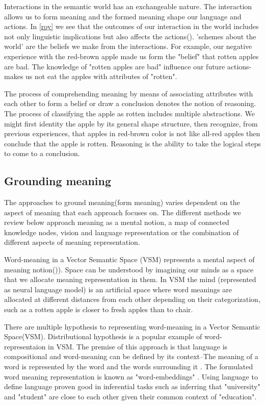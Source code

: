\documentclass[11pt, a4paper]{article}
\begin{document}
Interactions in the semantic world  has an exchangeable nature. The interaction allows us to form meaning and the formed meaning shape our language and actions. In \ref{roy} we see that the outcomes of our interaction in the world includes not only linguistic implications but also affects the actions(\cite{roy2005semiotic}). 'schemes about the world' are the beliefs we make from the interactions. For example, our negative experience with the red-brown apple made us form the  "belief" that rotten apples are bad. The knowledge of "rotten apples are bad" influence our future actions- makes us not eat the apples with attributes of "rotten". 

The process of comprehending meaning by means of associating attributes with each other to form a belief or draw a conclusion denotes the notion of reasoning. The process of classifying the apple as rotten includes multiple abstractions. We might first identity the apple by its general shape structure, then recognize, from previous experiences, that  apples in red-brown color is not like all-red apples then conclude that the apple is rotten. Reasoning is the ability to take the logical steps to come to a conclusion.  
 


\subsection{Grounding meaning}

The approaches to ground meaning(form meaning) varies dependent on the aspect of meaning that each approach focuses on. The different methods we review below approach meaning as a mental notion, a map of connected knowledge nodes,  vision and language representation or  the combination of different aspects of meaning representation. 


Word-meaning in a Vector Semantic Space (VSM) represents a mental aspect of meaning notion(\cite{Turney_2010})). Space can be understood by imagining our minds as a space that we allocate meaning representation in them. In VSM the mind (represented as neural language model) is an artificial space where word meanings are allocated at different distances from each other depending on their categorization, such as a rotten apple is closer to fresh apples than to chair. 

There are multiple hypothesis to representing word-meaning in a Vector Semantic Space(VSM). Distributional hypothesis is a popular example of word-representaion in VSM. The premise of this approach is that language is compositional and word-meaning can be defined by its context--The meaning of a word is represented by the word and the words surrounding it \cite{Turney_2010}. The formulated word meaning representation is known as "word-embeddings" \cite{mikolov2013distributed}. Using language to define language proven good in inferential tasks such as inferring that "university" and "student" are close to each other given their common context of "education". 
 
\end{document}
